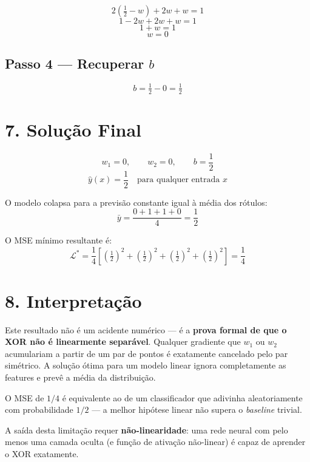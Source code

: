\documentclass[12pt, a4paper]{article}
\begin{document}
\[
  2\!\left(\tfrac{1}{2} - w\right) + 2w + w = 1
\]
\[
  1 - 2w + 2w + w = 1
\]
\[
  1 + w = 1
\]
\[
  \boxed{w = 0}
\]

\subsection*{Passo 4 — Recuperar $b$}

\[
  b = \tfrac{1}{2} - 0 = \boxed{\tfrac{1}{2}}
\]

\section*{7. Solução Final}

\begin{caixadestaque}
\[
  w_1 = 0, \qquad w_2 = 0, \qquad b = \frac{1}{2}
\]
\[
  \hat{y}(x) = \frac{1}{2} \quad \text{para qualquer entrada } x
\]
\end{caixadestaque}

O modelo colapsa para a previsão constante igual à média dos rótulos:
\[
  \bar{y} = \frac{0 + 1 + 1 + 0}{4} = \frac{1}{2}
\]

O MSE mínimo resultante é:
\[
  \mathcal{L}^* = \frac{1}{4}\left[
    \left(\tfrac{1}{2}\right)^2 +
    \left(\tfrac{1}{2}\right)^2 +
    \left(\tfrac{1}{2}\right)^2 +
    \left(\tfrac{1}{2}\right)^2
  \right] = \frac{1}{4}
\]

\section*{8. Interpretação}

Este resultado não é um acidente numérico — é a \textbf{prova formal de que o XOR não é linearmente separável}. Qualquer gradiente que $w_1$ ou $w_2$ acumulariam a partir de um par de pontos é exatamente cancelado pelo par simétrico. A solução ótima para um modelo linear ignora completamente as features e prevê a média da distribuição.

O MSE de $1/4$ é equivalente ao de um classificador que adivinha aleatoriamente com probabilidade $1/2$ — a melhor hipótese linear não supera o \emph{baseline} trivial.

A saída desta limitação requer \textbf{não-linearidade}: uma rede neural com pelo menos uma camada oculta (e função de ativação não-linear) é capaz de aprender o XOR exatamente.
\end{document}
